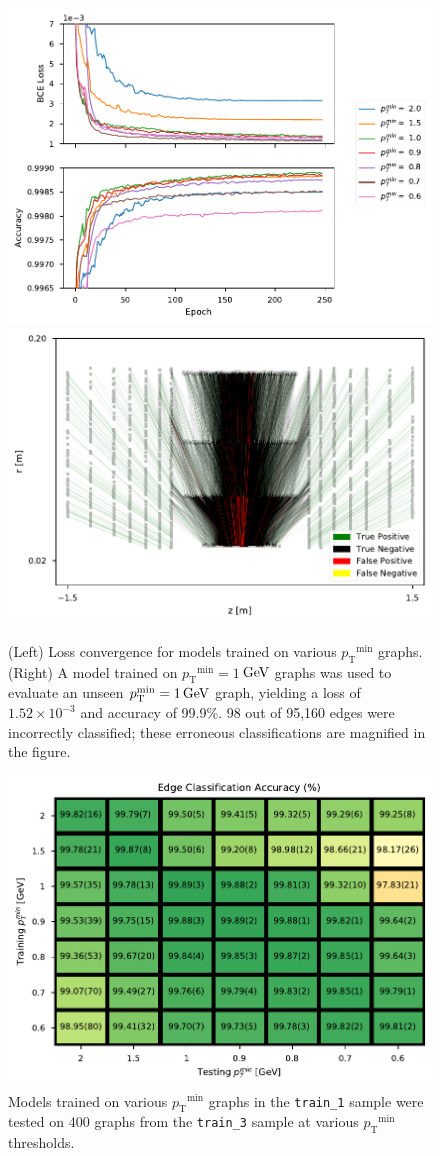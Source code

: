 \documentclass[twocolumn]{svjour3}
\newcommand{\pt}{\ensuremath{p_{\mathrm{T}}}\xspace}
\newcommand{\GeV}{\ensuremath{\,\text{Ge\hspace{-.08em}V}}\xspace}
\begin{document}
\begin{figure}[!htbp]
\centering
  \includegraphics[width=.45\linewidth]{training_convergence.pdf}
  \includegraphics[width=.5\linewidth]{confusion_matrix_graph.pdf}
\captionsetup{labelfont=bf}
\caption{(Left) Loss convergence for models trained on various $\pt^\mathrm{min}$ graphs. 
(Right) A model trained on $\pt^\mathrm{min}=1$\GeV graphs was used to evaluate an unseen $\pt^\mathrm{min}=1\GeV$ graph, yielding a loss of $1.52\times10^{-3}$ and accuracy of 99.9\%. 
98 out of 95,160 edges were incorrectly classified; these erroneous classifications are magnified in the figure.}
\label{fig:classification}
\end{figure}


\begin{figure}[!htbp]
\centering
\captionsetup{labelfont=bf}
\includegraphics[width=\columnwidth,clip]{transfer_learning.pdf}
\caption{Models trained on various $\pt^\mathrm{min}$ graphs in the \texttt{train\_1} sample were tested on 400 graphs from the \texttt{train\_3} sample at various $\pt^\mathrm{min}$ thresholds. }
\label{fig:accuracy}
\end{figure}
\end{document}
